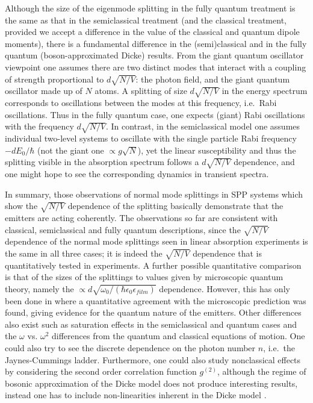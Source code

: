 \documentclass[12pt]{iopart}
\begin{document}
Although the size of the eigenmode splitting in the fully quantum treatment is the same as that in the semiclassical treatment (and the classical treatment, provided we accept a difference in the value of the classical and quantum dipole moments), there is a fundamental difference in the (semi)classical and in the fully quantum (boson-approximated Dicke) results. From the giant quantum oscillator viewpoint one assumes there are two distinct modes that interact with a coupling of strength proportional to $d\sqrt{N/V}$: the photon field, and the giant quantum oscillator made up of $N$ atoms. A splitting of size $d\sqrt{N/V}$ in the energy spectrum corresponds to oscillations between the modes at this frequency, i.e.\ Rabi oscillations. Thus in the fully quantum case, one expects (giant) Rabi oscillations with the frequency $d\sqrt{N/V}$. In contrast, in the semiclassical model one assumes individual two-level systems to oscillate with the single particle Rabi frequency $-d E_0/\hbar$ (not the giant one 
$\propto g\sqrt{N}$), yet the linear susceptibility and thus the splitting visible in the absorption spectrum follows a $d\sqrt{N/V}$ dependence, and one might hope to see the corresponding dynamics in transient spectra.   

In summary, those observations of normal mode splittings in SPP systems which show the $\sqrt{N/V}$ dependence of the splitting basically demonstrate that the emitters are acting coherently. The observations so far are consistent with classical, semiclassical and fully quantum descriptions, since the $\sqrt{N/V}$ dependence of the normal mode splittings seen in linear absorption experiments is the same in all three cases; it is indeed the $\sqrt{N/V}$ dependence that is quantitatively tested in experiments. A further possible quantitative comparison is that of the sizes of the splittings to values given by microscopic quantum theory, namely the $\propto d\sqrt{\omega_0/(\hbar \epsilon_0 \epsilon_{film})}$ dependence. However, this has only been done in \cite{Shi2014} where a quantitative agreement with the microscopic prediction was found, giving evidence for the quantum nature of the emitters. Other differences also exist such as saturation effects in the semiclassical and quantum cases and the $\omega$ vs. $\omega^2$ differences from the quantum and classical equations of motion. One could also try to see the discrete dependence on the photon number $n$, i.e.\ the Jaynes-Cummings ladder. Furthermore, one could also study nonclassical effects by considering the second order correlation function $g^{(2)}$, although the regime of bosonic approximation of the Dicke model does not produce interesting results, instead one has to include non-linearities inherent in the Dicke model \cite{Gonzalez-Tudela2013}.
\end{document}

